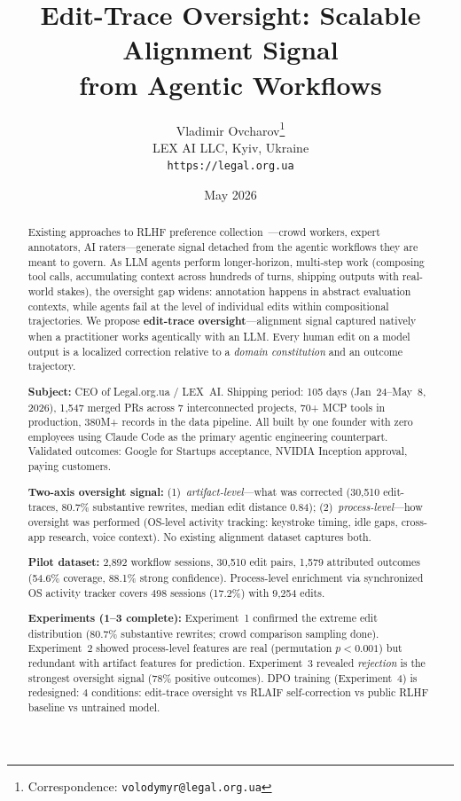 \documentclass[11pt]{article}
\title{%
  Edit-Trace Oversight: Scalable Alignment Signal \\
  from Agentic Workflows%
}
\author{
  Vladimir Ovcharov\thanks{Correspondence: \texttt{volodymyr@legal.org.ua}}\\
  LEX AI LLC, Kyiv, Ukraine\\
  \texttt{https://legal.org.ua}
}
\date{May 2026}
\begin{document}
\maketitle

\begin{abstract}
Existing approaches to RLHF preference collection~\citep{christiano2017deep, ziegler2019fine, ouyang2022training}---crowd workers, expert annotators, AI raters---generate signal detached from the agentic workflows they are meant to govern.
As LLM agents perform longer-horizon, multi-step work (composing tool calls, accumulating context across hundreds of turns, shipping outputs with real-world stakes), the oversight gap widens: annotation happens in abstract evaluation contexts, while agents fail at the level of individual edits within compositional trajectories.
We propose \textbf{edit-trace oversight}---alignment signal captured natively when a practitioner works agentically with an LLM.
Every human edit on a model output is a localized correction relative to a \emph{domain constitution} and an outcome trajectory.

\textbf{Subject:} CEO of Legal.org.ua / LEX~AI.
Shipping period: 105 days (Jan~24--May~8, 2026), 1{,}547 merged PRs across 7 interconnected projects, 70+ MCP tools in production, 380M+ records in the data pipeline.
All built by one founder with zero employees using Claude Code as the primary agentic engineering counterpart.
Validated outcomes: Google for Startups acceptance, NVIDIA Inception approval, paying customers.

\textbf{Two-axis oversight signal:}
(1)~\emph{artifact-level}---what was corrected (30{,}510 edit-traces, 80.7\% substantive rewrites, median edit distance 0.84);
(2)~\emph{process-level}---how oversight was performed (OS-level activity tracking: keystroke timing, idle gaps, cross-app research, voice context).
No existing alignment dataset captures both.

\textbf{Pilot dataset:} 2{,}892 workflow sessions, 30{,}510 edit pairs, 1{,}579 attributed outcomes (54.6\% coverage, 88.1\% strong confidence).
Process-level enrichment via synchronized OS activity tracker covers 498 sessions (17.2\%) with 9{,}254 edits.

\textbf{Experiments (1--3 complete):}
Experiment~1 confirmed the extreme edit distribution (80.7\% substantive rewrites; crowd comparison sampling done).
Experiment~2 showed process-level features are real (permutation $p<0.001$) but redundant with artifact features for prediction.
Experiment~3 revealed \emph{rejection} is the strongest oversight signal (78\% positive outcomes).
DPO training (Experiment~4) is redesigned: 4 conditions: edit-trace oversight vs RLAIF self-correction vs public RLHF baseline vs untrained model.


\end{abstract}
\end{document}
